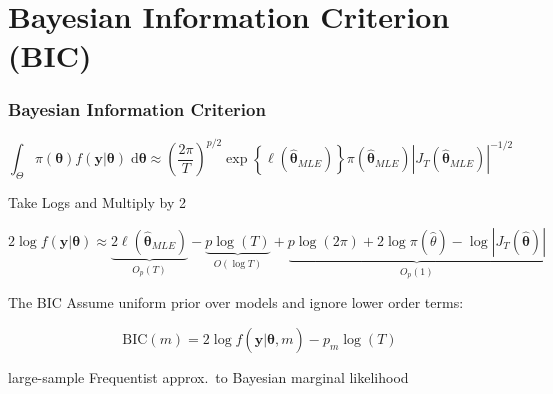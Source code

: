 \section{Bayesian Information Criterion (BIC)}
\begin{frame}
  \frametitle{Bayesian Information Criterion}

  \vspace{-2em}

\small
  \[
    \int_\Theta \pi(\boldsymbol{\theta})f(\mathbf{y}|\boldsymbol{\theta})\;\text{d}\boldsymbol{\theta} \approx \left( \frac{2\pi}{T} \right)^{p/2}\exp\left\{ \ell(\widehat{\boldsymbol{\theta}}_{MLE})\right\} \pi(\widehat{\boldsymbol{\theta}}_{MLE})  \left|J_T(\widehat{\boldsymbol{\theta}}_{MLE})\right|^{-1/2}
  \]

  \vspace{1em}

  \pause

  \begin{block}{Take Logs and Multiply by 2}

    \vspace{-2em}
    \small
    \[2 \log f(\mathbf{y}|\boldsymbol{\theta}) \approx \underbrace{2 \ell(\widehat{\boldsymbol{\theta}}_{MLE})}_{O_p(T)} - \underbrace{p \log(T)}_{O(\log T)} + \underbrace{p \log (2\pi) + 2\log \pi(\widehat{\theta}) - \log |J_T(\widehat{\boldsymbol{\theta}})|}_{O_p(1)}\]
  \end{block}

  \pause

  \vspace{-2em}

  \begin{block}{The BIC}
    \normalsize
    Assume uniform prior over \alert{models} and ignore lower order terms: 

    \[
      \text{BIC}(m) = 2 \log f(\mathbf{y}|\widehat{\boldsymbol{\theta}},m) - p_m \log(T)
    \]

    large-sample Frequentist approx.\ to Bayesian marginal likelihood
  \end{block}
\end{frame}
